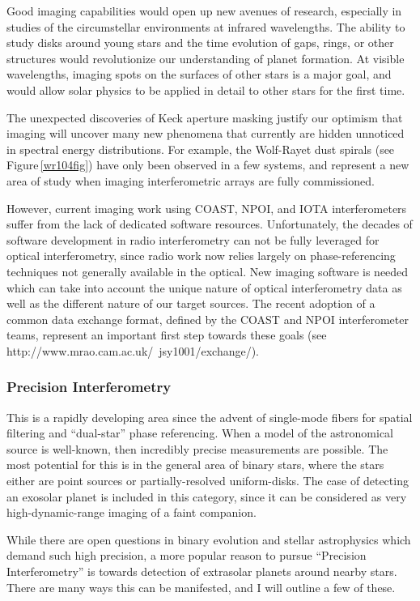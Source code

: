 \documentclass[12pt]{article}
\begin{document}
Good imaging capabilities would open up new avenues of research,
especially in studies of the circumstellar environments at infrared
wavelengths.  The ability to study disks around young stars and the
time evolution of gaps, rings, or other structures would revolutionize
our understanding of planet formation.  At visible wavelengths,
imaging spots on the surfaces of other stars is a major goal, and
would allow solar physics to be applied in detail to other stars for
the first time.

The unexpected discoveries of Keck aperture masking
justify our optimism that imaging will uncover many new phenomena that
currently are hidden unnoticed in spectral energy distributions.
For example, the Wolf-Rayet dust spirals (see
Figure\,\ref{wr104fig}) have only been observed in a few systems, and
represent a new area of study when imaging interferometric arrays are
fully commissioned.

However, current imaging work using COAST, NPOI, and IOTA
interferometers suffer from the lack of dedicated software resources.
Unfortunately, the decades of software development in radio
interferometry can not be fully leveraged for optical interferometry,
since radio work now relies largely on phase-referencing techniques
not generally available in the optical.  New imaging software is
needed which can take into account the unique nature of optical
interferometry data as well as the different nature of our target
sources.  The recent adoption of a common data exchange format,
defined by the COAST and NPOI interferometer teams, represent an
important first step towards these goals (see
http://www.mrao.cam.ac.uk/~jsy1001/exchange/).


\subsubsection{Precision Interferometry}
\label{precision}

This is a rapidly developing area since the advent of single-mode
fibers for spatial filtering and ``dual-star'' phase referencing.
When a model of the astronomical source is well-known, then incredibly
precise measurements are possible.  The most potential for this is in
the general area of binary stars, where the stars
either are point sources or partially-resolved uniform-disks.  The
case of detecting an exosolar planet is included in this category,
since it can be considered as very high-dynamic-range imaging of a
faint companion.

While there are open questions in binary evolution and stellar
astrophysics which demand such high precision, a more popular reason
to pursue ``Precision Interferometry'' is towards detection of
extrasolar planets around nearby stars.  There are many ways this can
be manifested, and I will outline a few of these.
\end{document}
